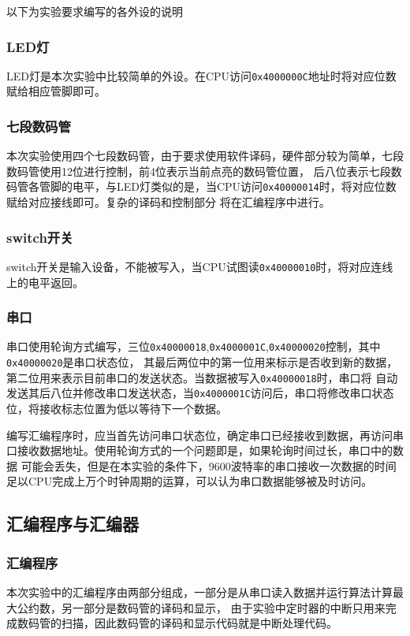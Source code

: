 \documentclass{ctexart}
\begin{document}
以下为实验要求编写的各外设的说明

			\subsubsection{LED灯}
			LED灯是本次实验中比较简单的外设。在CPU访问\verb"0x4000000C"地址时将对应位数赋给相应管脚即可。
			\subsubsection{七段数码管}
			本次实验使用四个七段数码管，由于要求使用软件译码，硬件部分较为简单，七段数码管使用12位进行控制，前4位表示当前点亮的数码管位置，
			后八位表示七段数码管各管脚的电平，与LED灯类似的是，当CPU访问\verb"0x40000014"时，将对应位数赋给对应接线即可。复杂的译码和控制部分
			将在汇编程序中进行。
			\subsubsection{switch开关}
			switch开关是输入设备，不能被写入，当CPU试图读\verb"0x40000010"时，将对应连线上的电平返回。
			\subsubsection{串口}
			
			串口使用轮询方式编写，三位\verb"0x40000018",\verb"0x4000001C",\verb"0x40000020"控制，其中\verb"0x40000020"是串口状态位，
			其最后两位中的第一位用来标示是否收到新的数据，第二位用来表示目前串口的发送状态。当数据被写入\verb"0x40000018"时，串口将
			自动发送其后八位并修改串口发送状态，当\verb"0x4000001C"访问后，串口将修改串口状态位，将接收标志位置为低以等待下一个数据。

			编写汇编程序时，应当首先访问串口状态位，确定串口已经接收到数据，再访问串口接收数据地址。使用轮询方式的一个问题即是，如果轮询时间过长，串口中的数据
			可能会丢失，但是在本实验的条件下，9600波特率的串口接收一次数据的时间足以CPU完成上万个时钟周期的运算，可以认为串口数据能够被及时访问。


		\subsection{汇编程序与汇编器}
		\subsubsection{汇编程序}
			本次实验中的汇编程序由两部分组成，一部分是从串口读入数据并运行算法计算最大公约数，另一部分是数码管的译码和显示，
			由于实验中定时器的中断只用来完成数码管的扫描，因此数码管的译码和显示代码就是中断处理代码。
\end{document}
